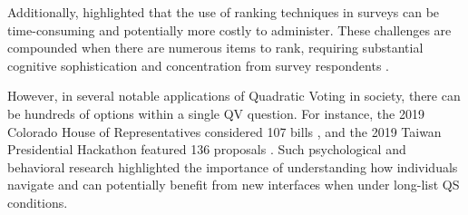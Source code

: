 Additionally, \textcite{alwinMeasurementValuesSurveys1985} highlighted that the use of ranking techniques in surveys can be time-consuming and potentially more costly to administer. These challenges are compounded when there are numerous items to rank, requiring substantial cognitive sophistication and concentration from survey respondents \cite{featherMeasurementValuesEffects1973}.

However, in several notable applications of Quadratic Voting in society, there can be hundreds of options within a single QV question. For instance, the 2019 Colorado House of Representatives considered 107 bills \cite{coyNewWayVoting2019}, and the 2019 Taiwan Presidential Hackathon featured 136 proposals \cite{QuadraticVotingFrontend2022}. Such psychological and behavioral research highlighted the importance of understanding how individuals navigate and can potentially benefit from new interfaces when under long-list QS conditions.


